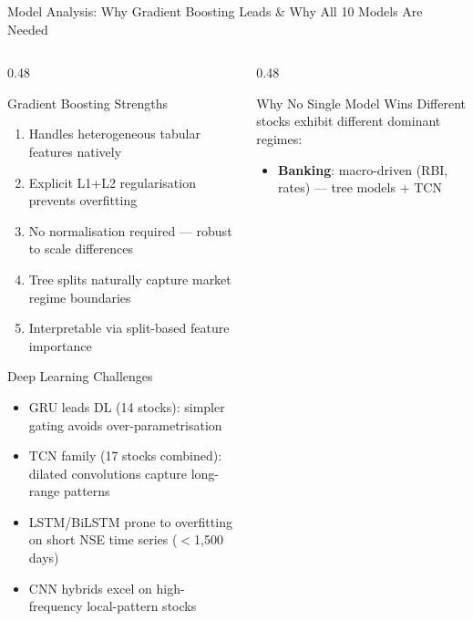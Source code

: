 \documentclass[aspectratio=43,11pt]{beamer}
\begin{document}
\begin{frame}[shrink=12]{Model Analysis: Why Gradient Boosting Leads \& Why All 10 Models Are Needed}
    \begin{columns}[T]
        \begin{column}{0.48\textwidth}
            \begin{block}{Gradient Boosting Strengths}
                \footnotesize\setlength{\itemsep}{1pt}
                \begin{enumerate}
                    \item Handles heterogeneous tabular features natively
                    \item Explicit L1+L2 regularisation prevents overfitting
                    \item No normalisation required --- robust to scale differences
                    \item Tree splits naturally capture market regime boundaries
                    \item Interpretable via split-based feature importance
                \end{enumerate}
            \end{block}
            \begin{block}{Deep Learning Challenges}
                \footnotesize\setlength{\itemsep}{1pt}
                \begin{itemize}
                    \item GRU leads DL (14 stocks): simpler gating avoids over-parametrisation
                    \item TCN family (17 stocks combined): dilated convolutions capture long-range patterns
                    \item LSTM/BiLSTM prone to overfitting on short NSE time series ($<$1{,}500 days)
                    \item CNN hybrids excel on high-frequency local-pattern stocks
                \end{itemize}
            \end{block}
        \end{column}
        \begin{column}{0.48\textwidth}
            \begin{exampleblock}{Why No Single Model Wins}
                \footnotesize Different stocks exhibit different dominant regimes:
                \begin{itemize}\setlength{\itemsep}{1pt}
                    \item \textbf{Banking}: macro-driven (RBI, rates) --- tree models + TCN

\end{itemize}
\end{exampleblock}
\end{column}
\end{columns}
\end{frame}
\end{document}
